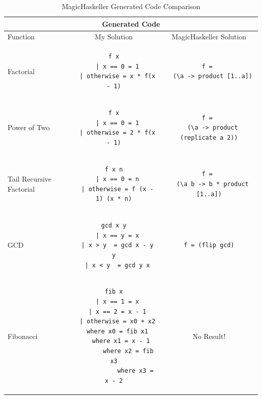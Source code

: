 \begin{table}[p!]
\centering
\begin{tabular}{| m{4em} | c | c |}
\hline
\multicolumn{3}{|c|}{\textbf{Generated Code}} \\
\hline
Function & My Solution & MagicHaskeller Solution \\
\hline
Factorial 
&
\begin{lstlisting}[backgroundcolor = \color{white}]
f x
  | x == 0 = 1
  | otherwise = x * f(x - 1)
\end{lstlisting}
& 
\begin{lstlisting}[backgroundcolor = \color{white}]
f = 
  (\a -> product [1..a])
\end{lstlisting}
\\
\hline
\mbox{}\newline
Power \newline
of \newline
Two \newline
&
\mbox{}\newline
\begin{lstlisting}[backgroundcolor = \color{white}]
f x
  | x == 0 = 1
  | otherwise = 2 * f(x - 1)
\end{lstlisting}
& 
\begin{lstlisting}[backgroundcolor = \color{white}]
f = 
  (\a -> product (replicate a 2))
\end{lstlisting}
\\
\hline
\mbox{}\newline
Tail \newline
Recursive \newline
Factorial \newline
&
\begin{lstlisting}[backgroundcolor = \color{white}]
f x n
  | x == 0 = n
  | otherwise = f (x - 1) (x * n)
\end{lstlisting}
& 
\begin{lstlisting}[backgroundcolor = \color{white}]
f = 
  (\a b -> b * product [1..a])
\end{lstlisting}
\\
\hline
GCD 
&
\begin{lstlisting}[backgroundcolor = \color{white}]
gcd x y
  | x == y = x
  | x > y  = gcd x - y y
  | x < y  = gcd y x
\end{lstlisting}	
&
\begin{lstlisting}[backgroundcolor = \color{white}]
f = (flip gcd)
\end{lstlisting}
\\
\hline
Fibonacci
&
\begin{lstlisting}[backgroundcolor = \color{white}]
fib x
  | x == 1 = x
  | x == 2 = x - 1
  | otherwise = x0 + x2
  where x0 = fib x1
  	where x1 = x - 1
  		where x2 = fib x3
  			where x3 = x - 2
\end{lstlisting}
&
No Result!
\\
\hline
\end{tabular}
\caption{MagicHaskeller Generated Code Comparison }
\label{table:1}
\end{table}
\Reactivatenumber

